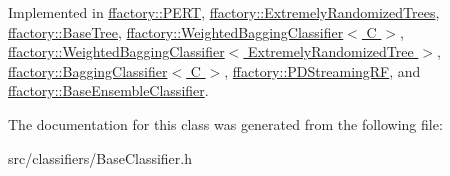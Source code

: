 Implemented in \hyperlink{classffactory_1_1_p_e_r_t_a7e8906ac8c355ab9832578d8acd41db0}{ffactory\-::\-P\-E\-R\-T}, \hyperlink{classffactory_1_1_extremely_randomized_trees_aa422b510fa91c27fb61eecbd5663cbd8}{ffactory\-::\-Extremely\-Randomized\-Trees}, \hyperlink{classffactory_1_1_base_tree_ad93e4fb475d3159a378b5148b127a58a}{ffactory\-::\-Base\-Tree}, \hyperlink{classffactory_1_1_weighted_bagging_classifier_a9c083e5508f58695c569dd2a4df50fd3}{ffactory\-::\-Weighted\-Bagging\-Classifier$<$ C $>$}, \hyperlink{classffactory_1_1_weighted_bagging_classifier_a9c083e5508f58695c569dd2a4df50fd3}{ffactory\-::\-Weighted\-Bagging\-Classifier$<$ Extremely\-Randomized\-Tree $>$}, \hyperlink{classffactory_1_1_bagging_classifier_ac99041bbde5f875cee90fcd7075c1f60}{ffactory\-::\-Bagging\-Classifier$<$ C $>$}, \hyperlink{classffactory_1_1_p_d_streaming_r_f_a711860e77360cb3fa8ff2a3160657997}{ffactory\-::\-P\-D\-Streaming\-R\-F}, and \hyperlink{classffactory_1_1_base_ensemble_classifier_a6ea804da2a71766b49372cbddb12cd50}{ffactory\-::\-Base\-Ensemble\-Classifier}.



The documentation for this class was generated from the following file\-:\begin{DoxyCompactItemize}
\item 
src/classifiers/Base\-Classifier.\-h\end{DoxyCompactItemize}
